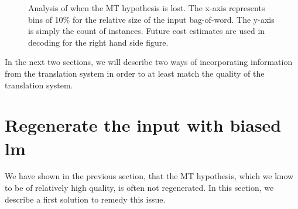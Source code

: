 \begin{figure}
\begin{center}
\begin{minipage}{.45\textwidth}
\end{minipage}
\caption{Analysis of when the MT hypothesis is lost. The x-axis represents bins of 10\% for the relative size of the input bag-of-word.
The y-axis is simply the count of instances. Future cost estimates are used in decoding for the right hand side figure.}
\label{fig:whenLostInput}
\end{center}
\end{figure}
%
In the next two sections, we will describe two ways of incorporating
information from the translation system in order to at least
match the quality of the translation system.

\section{Regenerate the input with biased lm}
\label{sec:gyroTransBiasedLm}

We have shown in the previous section, that the MT hypothesis, which
we know to be of relatively high quality, is often not regenerated.
In this section, we describe a first solution to remedy this issue.

